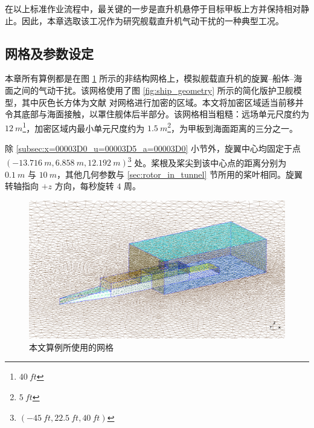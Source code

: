 在以上标准作业流程中，最关键的一步是直升机悬停于目标甲板上方并保持相对静止。因此，本章选取该工况作为研究舰载直升机气动干扰的一种典型工况。

\subsection{网格及参数设定}

本章所有算例都是在图 \ref{fig:ship_mesh} 所示的非结构网格上，模拟舰载直升机的旋翼–船体–海面之间的气动干扰。该网格使用了图
\ref{fig:ship_geometry} 所示的简化版护卫舰模型，其中灰色长方体为文献 \cite{Thedin_2020}
对网格进行加密的区域。本文将加密区域适当前移并令其底部与海面接触，以罩住舰体后半部分。该网格相当粗糙：远场单元尺度约为 $\SI{12}{m}$\footnote{$\SI{40}{ft}$}，加密区域内最小单元尺度约为
$\SI{1.5}{m}$\footnote{$\SI{5}{ft}$}，为甲板到海面距离的三分之一。

除 \ref{subsec:x=00003D0_u=00003D5_a=00003D0} 小节外，旋翼中心均固定于点 $(\SI{-13.716}{m},\SI{6.858}{m},\SI{12.192}{m})$\footnote{$(\SI{-45}{ft},\SI{22.5}{ft},\SI{40}{ft})$}
处。桨根及桨尖到该中心点的距离分别为 $\SI{0.1}{m}$ 与 $\SI{10}{m}$，其他几何参数与 \ref{sec:rotor_in_tunnel}
节所用的桨叶相同。旋翼转轴指向 $+z$ 方向，每秒旋转 $4$ 周。

\begin{figure}[h!]
\begin{centering}
\includegraphics[width=1\textwidth,height=0.4\textheight,keepaspectratio]{figures/ship/grid}
\par\end{centering}
\caption{\label{fig:ship_mesh}本文算例所使用的网格}
\end{figure}

